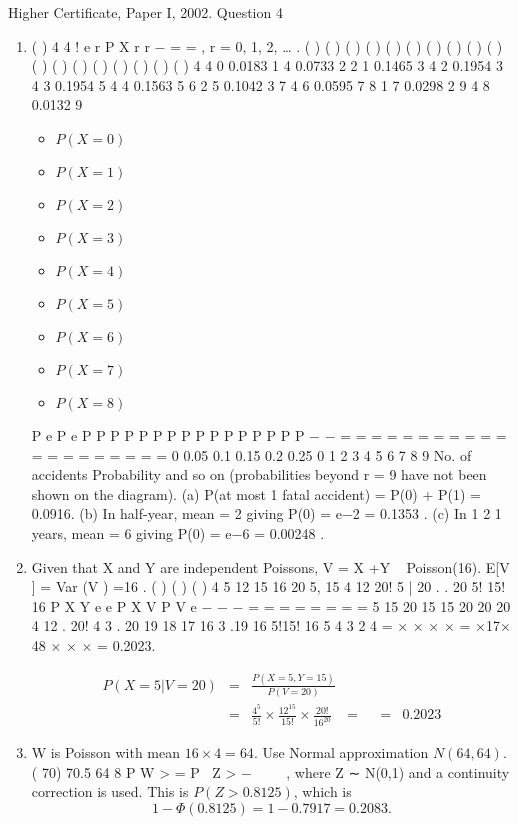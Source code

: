 \documentclass[a4paper,12pt]{article}
\begin{document}
Higher Certificate, Paper I, 2002. Question 4
\begin{enumerate}
\item ( )
4 4
!
e r P X r
r
−
= = , r = 0, 1, 2, … .
( )
( )
( ) ( )
( ) ( )
( ) ( )
( ) ( )
( ) ( )
( ) ( )
( ) ( )
( ) ( )
4
4
0 0.0183
1 4 0.0733
2 2 1 0.1465
3 4 2 0.1954
3
4 3 0.1954
5 4 4 0.1563
5
6 2 5 0.1042
3
7 4 6 0.0595
7
8 1 7 0.0298
2
9 4 8 0.0132
9

\begin{itemize}
    \item $P(X=0)$
    \item $P(X=1)$
    \item $P(X=2)$
    \item $P(X=3)$
    \item $P(X=4)$
    \item $P(X=5)$
    \item $P(X=6)$
    \item $P(X=7)$
    \item $P(X=8)$
\end{itemize}

P e
P e
P P
P P
P P
P P
P P
P P
P P
P P
−
−
= =
= =
= =
= =
= =
= =
= =
= =
= =
= =
0
0.05
0.1
0.15
0.2
0.25
0 1 2 3 4 5 6 7 8 9
No. of accidents
Probability
and so on (probabilities beyond r = 9 have not been shown on the diagram).
(a) P(at most 1 fatal accident) = P(0) + P(1) = 0.0916.
(b) In half-year, mean = 2 giving P(0) = e−2 = 0.1353 .
(c) In 1
2 1 years, mean = 6 giving P(0) = e−6 = 0.00248 .
\item  Given that X and Y are independent Poissons, V = X +Y ~ Poisson(16).
E[V ] = Var (V ) =16 .
( ) ( )
( )
4 5 12 15
16 20
5, 15 4 12 20! 5 | 20 . .
20 5! 15! 16
P X Y e e P X V
P V e
− −
−
= =
= = = =
=
=
5 15 20 15 15
20 20 20
4 12 . 20! 4 3 . 20 19 18 17 16 3 .19
16 5!15! 16 5 4 3 2 4
= × × × × = ×17× 48
× × ×
= 0.2023.

\begin{eqnarray*}
P(X=5|V=20) &=& \frac{P(X=5,Y=15)}{P(V=20)}\\
&=& \frac{4^5}{5!} \times \frac{12^{15}}{15!} \times \frac{20!}{16^{20}}
&=&
&=& 0.2023
\end{eqnarray*}

\item  W is Poisson with mean $16 \times 4 = 64$. Use Normal approximation $N(64, 64)$.
( 70) 70.5 64
8
P W > = P Z > − 
 
, where Z ∼ N(0,1) and a continuity correction is
used. This is $P(Z > 0.8125)$, which is \[1−\Phi(0.8125) =1− 0.7917 = 0.2083.\]
\end{enumerate}
\end{document}
